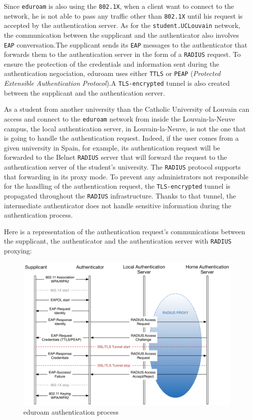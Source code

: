 Since \texttt{eduroam} is also using the \texttt{802.1X}, when a client want to connect to the network, he is not able to pass any traffic other than \texttt{802.1X} until his request is accepted by the authentication server. As for the \texttt{student.UCLouvain} network, the communication between the supplicant and the authenticator also involves \texttt{EAP} conversation.The supplicant sends its \texttt{EAP} messages to the authenticator that forwards them to the authentication server in the form of a \texttt{RADIUS} request. To ensure the protection of the credentials and information sent during the authentication negociation, eduroam uses either \texttt{TTLS} or \texttt{PEAP} (\textit{Protected Extensible Authentication Protocol}).A \texttt{TLS-encrypted} tunnel is also created between the supplicant and the authentication server.

As a student from another university than the Catholic University of Louvain can access and connect to the \texttt{eduroam} network from inside the Louvain-la-Neuve campus, the local authentication server, in Louvain-la-Neuve, is not the one that is going to handle the authentication request. Indeed, if the user comes from a given university in Spain, for example, its authentication request will be forwarded to the Belnet \texttt{RADIUS} server that will forward the request to the authentication server of the student's university. The \texttt{RADIUS} protocol supports that forwarding in its proxy mode. To prevent any administrators not responsible for the handling of the authentication request, the \texttt{TLS-encrypted} tunnel is propagated throughout the \texttt{RADIUS} infrastructure. Thanks to that tunnel, the intermediate authenticator does not handle sensitive information during the authentication process.

Here is a representation of the authentication request's communications between the supplicant, the authenticator and the authentication server with \texttt{RADIUS} proxying:
\begin{figure}[H]
	\includegraphics[width=1\linewidth]{Pictures/Chapter2/eduroam1.png}
	\caption{eduroam authentication process}
\end{figure}



